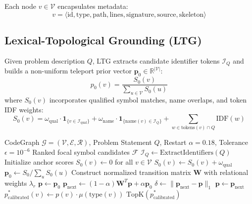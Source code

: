 \documentclass[11pt,a4paper]{article}
\theoremstyle{plain}
\theoremstyle{definition}
\begin{document}
Each node $v \in \mathcal{V}$ encapsulates metadata:
\begin{equation}
v = \langle \text{id}, \text{type}, \text{path}, \text{lines}, \text{signature}, \text{source}, \text{skeleton} \rangle
\end{equation}

\subsection{Lexical-Topological Grounding (LTG)}
Given problem description $Q$, LTG extracts candidate identifier tokens $\mathcal{I}_Q$ and builds a non-uniform teleport prior vector $\mathbf{p}_0 \in \mathbb{R}^{|\mathcal{V}|}$:
\begin{equation}
p_0(v) = \frac{S_0(v)}{\sum_{u \in \mathcal{V}} S_0(u)}
\end{equation}
where $S_0(v)$ incorporates qualified symbol matches, name overlaps, and token IDF weights:
\begin{equation}
S_0(v) = \omega_{\text{qual}} \cdot \mathbf{1}_{\{v \in \mathcal{I}_{\text{qual}}\}} + \omega_{\text{name}} \cdot \mathbf{1}_{\{\text{name}(v) \in \mathcal{I}_Q\}} + \sum_{w \in \text{tokens}(v) \cap Q} \text{IDF}(w)
\end{equation}

\begin{algorithm}[t]
\caption{Lexical-Topological Grounding and Multi-Relational PageRank}
\label{alg:ltg_ppr}
\begin{algorithmic}[1]
\Require CodeGraph $\mathcal{G} = (\mathcal{V}, \mathcal{E}, \mathcal{R})$, Problem Statement $Q$, Restart $\alpha=0.18$, Tolerance $\epsilon=10^{-6}$
\Ensure Ranked focal symbol candidates $\mathcal{F}$
\State $\mathcal{I}_Q \gets \text{ExtractIdentifiers}(Q)$
\State Initialize anchor scores $S_0(v) \gets 0$ for all $v \in \mathcal{V}$
            $S_0(v) \gets S_0(v) + \omega_{\text{qual}}$
        \EndIf
    \EndFor
\EndFor
\State $\mathbf{p}_0 \gets S_0 / \sum_{u} S_0(u)$
\State Construct normalized transition matrix $\mathbf{W}$ with relational weights $\lambda_r$
\State $\mathbf{p} \gets \mathbf{p}_0$
\Repeat
    \State $\mathbf{p}_{\text{next}} \gets (1 - \alpha) \mathbf{W}^T \mathbf{p} + \alpha \mathbf{p}_0$
    \State $\delta \gets \|\mathbf{p}_{\text{next}} - \mathbf{p}\|_1$
    \State $\mathbf{p} \gets \mathbf{p}_{\text{next}}$
\Until{$\delta < \epsilon$}
\State $p^*_{\text{calibrated}}(v) \gets p(v) \cdot \mu(\text{type}(v))$
\State \Return $\text{TopK}(p^*_{\text{calibrated}})$
\end{algorithmic}
\end{algorithm}
\end{document}
